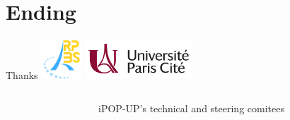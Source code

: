 \documentclass{beamer}
\begin{document}
\section{Ending}
\begin{frame}{Thanks}
    \center
    \includegraphics[height=1.5cm]{Logo/RPBS.png}
    \hspace{1cm}
    \includegraphics[height=1.5cm]{Logo/UniversiteLogo.png}
    \vspace{1cm}
    \begin{columns}
    \begin{column}{0.4\textwidth}
    \end{column}
   \begin{column}{0.4\textwidth}
    iPOP-UP's technical and steering comitees

    \end{column}
\end{columns}
\end{frame}
\end{document}
